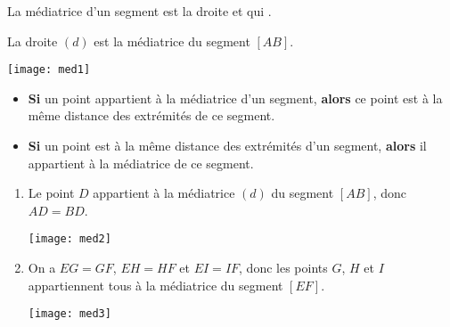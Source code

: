 \begin{mydef}
	La médiatrice d'un segment est la droite  et qui .
\end{mydef}


\begin{myex}
	La droite $(d)$ est la médiatrice du segment $[AB]$.
	
	\begin{center}
		\texttt{[image: med1]}
	\end{center}
\end{myex}

\begin{myprops}
	\begin{itemize}
		\item \textbf{Si} un point appartient à la médiatrice d'un segment, \textbf{alors} ce point est à la même distance des extrémités de ce segment.
		\item \textbf{Si} un point est à la même distance des extrémités d'un segment, \textbf{alors} il appartient à la médiatrice de ce segment.
	\end{itemize}
\end{myprops}


\begin{myexs}
	\begin{multicols}{2}
		
		\begin{enumerate}
			
			
			\item  Le point $D$ appartient à la médiatrice $(d)$ du segment $[AB]$, donc $AD=BD$.
			
			\vspace*{0.5cm}
			\begin{center}
				\texttt{[image: med2]}
			\end{center}
			
			
			\item On a $EG=GF$, $EH=HF$ et $EI=IF$, donc les points $G$, $H$ et $I$ appartiennent tous à la médiatrice du segment $[EF]$.
			
			\begin{center}
				\texttt{[image: med3]}
			\end{center}
			
		\end{enumerate}
	\end{multicols}
	
	
	
\end{myexs}

